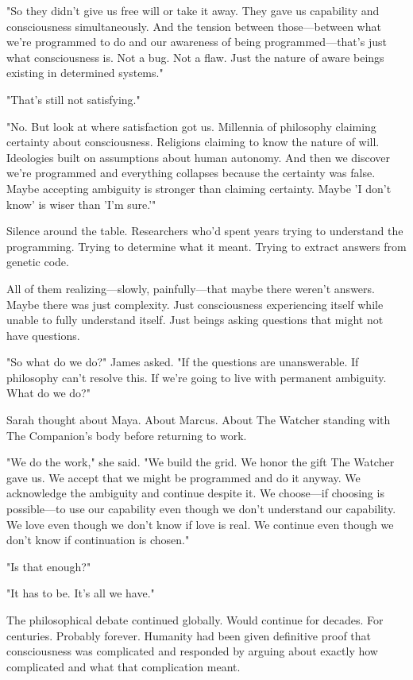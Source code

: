 "So they didn't give us free will or take it away. They gave us capability and consciousness simultaneously. And the tension between those—between what we're programmed to do and our awareness of being programmed—that's just what consciousness is. Not a bug. Not a flaw. Just the nature of aware beings existing in determined systems."

"That's still not satisfying."

"No. But look at where satisfaction got us. Millennia of philosophy claiming certainty about consciousness. Religions claiming to know the nature of will. Ideologies built on assumptions about human autonomy. And then we discover we're programmed and everything collapses because the certainty was false. Maybe accepting ambiguity is stronger than claiming certainty. Maybe 'I don't know' is wiser than 'I'm sure.'"

Silence around the table. Researchers who'd spent years trying to understand the programming. Trying to determine what it meant. Trying to extract answers from genetic code.

All of them realizing—slowly, painfully—that maybe there weren't answers. Maybe there was just complexity. Just consciousness experiencing itself while unable to fully understand itself. Just beings asking questions that might not have questions.

"So what do we do?" James asked. "If the questions are unanswerable. If philosophy can't resolve this. If we're going to live with permanent ambiguity. What do we do?"

Sarah thought about Maya. About Marcus. About The Watcher standing with The Companion's body before returning to work.

"We do the work," she said. "We build the grid. We honor the gift The Watcher gave us. We accept that we might be programmed and do it anyway. We acknowledge the ambiguity and continue despite it. We choose—if choosing is possible—to use our capability even though we don't understand our capability. We love even though we don't know if love is real. We continue even though we don't know if continuation is chosen."

"Is that enough?"

"It has to be. It's all we have."

\scenebreak

The philosophical debate continued globally. Would continue for decades. For centuries. Probably forever. Humanity had been given definitive proof that consciousness was complicated and responded by arguing about exactly how complicated and what that complication meant.

